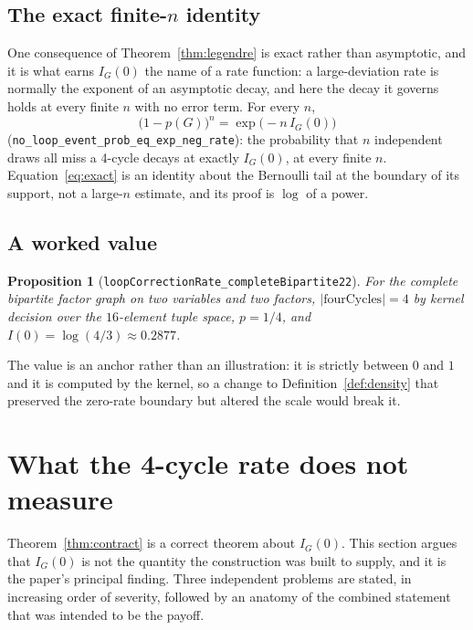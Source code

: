 \documentclass[aps,prx,reprint,nofootinbib,floatfix]{revtex4-2}
\newtheorem{prop}[thm]{Proposition}
\begin{document}
\subsection{The exact finite-$n$ identity}

One consequence of Theorem~\ref{thm:legendre} is exact rather than asymptotic,
and it is what earns $I_G(0)$ the name of a rate function: a large-deviation
rate is normally the exponent of an asymptotic decay, and here the decay it
governs holds at every finite $n$ with no error term. For every $n$,
\begin{equation}
\label{eq:exact}
\bigl(1 - p(G)\bigr)^{n} = \exp\bigl(-n\, I_G(0)\bigr)
\end{equation}
(\texttt{no\_loop\_event\_prob\_eq\_exp\_neg\_rate}): the probability that $n$
independent draws all miss a 4-cycle decays at exactly $I_G(0)$, at every finite
$n$. Equation~\eqref{eq:exact} is an identity about the Bernoulli tail at the
boundary of its support, not a large-$n$ estimate, and its proof is
$\log$ of a power.

\subsection{A worked value}

\begin{prop}[\texttt{loopCorrectionRate\_completeBipartite22}]
For the complete bipartite factor graph on two variables and two factors,
$|\mathrm{fourCycles}| = 4$ by kernel decision over the $16$-element tuple
space, $p = 1/4$, and $I(0) = \log(4/3) \approx 0.2877$.
\end{prop}

The value is an anchor rather than an illustration: it is strictly between $0$
and $1$ and it is computed by the kernel, so a change to
Definition~\ref{def:density} that preserved the zero-rate boundary but altered
the scale would break it.


\section{What the 4-cycle rate does not measure}
\label{sec:limits}

Theorem~\ref{thm:contract} is a correct theorem about $I_G(0)$. This section
argues that $I_G(0)$ is not the quantity the construction was built to supply,
and it is the paper's principal finding. Three independent problems are stated,
in increasing order of severity, followed by an anatomy of the combined
statement that was intended to be the payoff.
\end{document}
